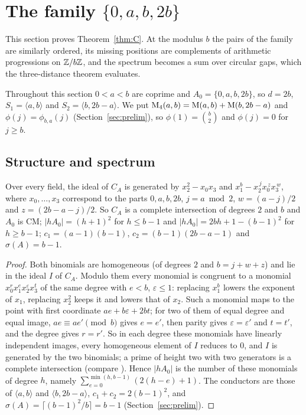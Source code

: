 \section{The family \texorpdfstring{$\{0,a,b,2b\}$}{\{0,a,b,2b\}}}\label{sec:family}

This section proves Theorem~\ref{thm:C}. At the modulus $b$ the pairs of the family are similarly ordered, its missing positions are complements of arithmetic progressions on $\mathbb{Z}/b\mathbb{Z}$, and the spectrum becomes a sum over circular gaps, which the three-distance theorem evaluates.

Throughout this section $0<a<b$ are coprime and $A_0=\{0,a,b,2b\}$, so $d=2b$, $S_1=\langle a,b\rangle$ and $S_2=\langle b,2b-a\rangle$. We put $\operatorname{M}_4(a,b)=\operatorname{M}(a,b)+\operatorname{M}(b,2b-a)$ and $\phi(j)=\phi_{b,a}(j)$ (Section~\ref{sec:prelim}), so $\phi(1)=\binom b2$ and $\phi(j)=0$ for $j\ge b$.

\subsection{Structure and spectrum}\label{subsec:family-structure}

\begin{lemma}\label{lem:family-ci}
Over every field, the ideal of $C_A$ is generated by $x_2^2-x_0x_3$ and $x_1^b-x_2^{\,j}x_0^{\,z}x_3^{\,w}$, where $x_0,\dots,x_3$ correspond to the parts $0,a,b,2b$, $j=a\bmod2$, $w=(a-j)/2$ and $z=(2b-a-j)/2$. So $C_A$ is a complete intersection of degrees $2$ and $b$ and $A_0$ is CM; $|hA_0|=(h+1)^2$ for $h\le b-1$ and $|hA_0|=2bh+1-(b-1)^2$ for $h\ge b-1$; $c_1=(a-1)(b-1)$, $c_2=(b-1)(2b-a-1)$ and $\sigma(A)=b-1$.
\end{lemma}

\begin{proof}
Both binomials are homogeneous (of degrees $2$ and $b=j+w+z$) and lie in the ideal $I$ of $C_A$. Modulo them every monomial is congruent to a monomial $x_0^rx_1^ex_2^\varepsilon x_3^t$ of the same degree with $e<b$, $\varepsilon\le1$: replacing $x_1^b$ lowers the exponent of $x_1$, replacing $x_2^2$ keeps it and lowers that of $x_2$. Such a monomial maps to the point with first coordinate $ae+b\varepsilon+2bt$; for two of them of equal degree and equal image, $ae\equiv ae'\pmod b$ gives $e=e'$, then parity gives $\varepsilon=\varepsilon'$ and $t=t'$, and the degree gives $r=r'$. So in each degree these monomials have linearly independent images, every homogeneous element of $I$ reduces to $0$, and $I$ is generated by the two binomials; a prime of height two with two generators is a complete intersection (compare \cite{BermejoGarciaMarco2014}). Hence $|hA_0|$ is the number of these monomials of degree $h$, namely $\sum_{e=0}^{\min(h,b-1)}(2(h-e)+1)$. The conductors are those of $\langle a,b\rangle$ and $\langle b,2b-a\rangle$, $c_1+c_2=2(b-1)^2$, and $\sigma(A)=\lceil(b-1)^2/b\rceil=b-1$ (Section~\ref{sec:prelim}).
\end{proof}

